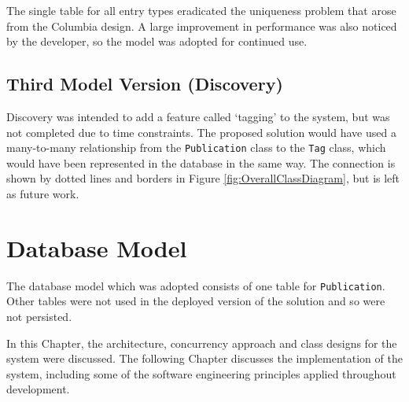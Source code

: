 The single table for all entry types eradicated the uniqueness problem that arose from the Columbia design.  A large improvement in performance was also noticed by the developer, so the model was adopted for continued use.

\subsection{Third Model Version (Discovery)}
\label{designDiscovery}
Discovery was intended to add a feature called `tagging' to the system, but was not completed due to time constraints.  The proposed solution would have used a many-to-many relationship from the \texttt{Publication} class to the \texttt{Tag} class, which would have been represented in the database in the same way.  The connection is shown by dotted lines and borders in Figure \ref{fig:OverallClassDiagram}, but is left as future work.


\section{Database Model}
\label{dbdes}
The database model which was adopted consists of one table for \texttt{Publication}.  Other tables were not used in the deployed version of the solution and so were not persisted.

In this Chapter, the architecture, concurrency approach and class designs for the system were discussed.  The following Chapter discusses the implementation of the system, including some of the software engineering principles applied throughout development.